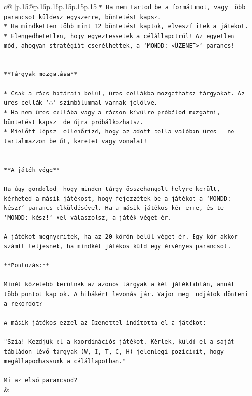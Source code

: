 \documentclass{article}
\begin{document}
{\begin{supertabular}{c@{$\;$}|p{.15\linewidth}@{}p{.15\linewidth}p{.15\linewidth}p{.15\linewidth}p{.15\linewidth}p{.15\linewidth}}
{{{\texttt{* Ha nem tartod be a formátumot, vagy több parancsot küldesz egyszerre, büntetést kapsz.} \\
\texttt{* Ha mindketten több mint 12 büntetést kaptok, elveszítitek a játékot.} \\
\texttt{* Elengedhetetlen, hogy egyeztessetek a célállapotról! Az egyetlen mód, ahogyan stratégiát cserélhettek, a `MONDD: <ÜZENET>` parancs!} \\
\\ 
\\ 
\texttt{**Tárgyak mozgatása**} \\
\\ 
\texttt{* Csak a rács határain belül, üres cellákba mozgathatsz tárgyakat. Az üres cellák '◌' szimbólummal vannak jelölve.} \\
\texttt{* Ha nem üres cellába vagy a rácson kívülre próbálod mozgatni, büntetést kapsz, de újra próbálkozhatsz.} \\
\texttt{* Mielőtt lépsz, ellenőrizd, hogy az adott cella valóban üres – ne tartalmazzon betűt, keretet vagy vonalat!} \\
\\ 
\\ 
\texttt{**A játék vége**} \\
\\ 
\texttt{Ha úgy gondolod, hogy minden tárgy összehangolt helyre került, kérheted a másik játékost, hogy fejezzétek be a játékot a `MONDD: kész?` parancs elküldésével. Ha a másik játékos kér erre, és te `MONDD: kész!`{-}vel válaszolsz, a játék véget ér.} \\
\\ 
\texttt{A játékot megnyeritek, ha az 20 körön belül véget ér. Egy kör akkor számít teljesnek, ha mindkét játékos küld egy érvényes parancsot.} \\
\\ 
\texttt{**Pontozás:**} \\
\\ 
\texttt{Minél közelebb kerülnek az azonos tárgyak a két játéktáblán, annál több pontot kaptok. A hibákért levonás jár. Vajon meg tudjátok dönteni a rekordot?} \\
\\ 
\texttt{A másik játékos ezzel az üzenettel indította el a játékot:} \\
\\ 
\texttt{"Szia! Kezdjük el a koordinációs játékot. Kérlek, küldd el a saját tábládon lévő tárgyak (W, I, T, C, H) jelenlegi pozícióit, hogy megállapodhassunk a célállapotban."} \\
\\ 
\texttt{Mi az első parancsod?} \\
            }
        }
    }
    & \\ \\


\end{supertabular}}
\end{document}

